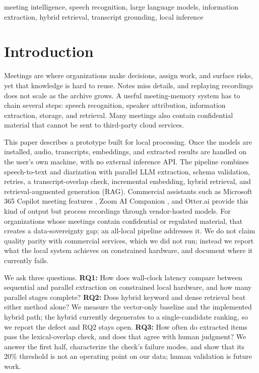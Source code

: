 \documentclass[conference]{IEEEtran}
\begin{document}
\begin{IEEEkeywords}
meeting intelligence, speech recognition, large language models, information extraction, hybrid retrieval, transcript grounding, local inference
\end{IEEEkeywords}

\section{Introduction}
Meetings are where organizations make decisions, assign work, and surface risks, yet that knowledge is hard to reuse. Notes miss details, and replaying recordings does not scale as the archive grows. A useful meeting-memory system has to chain several steps: speech recognition, speaker attribution, information extraction, storage, and retrieval. Many meetings also contain confidential material that cannot be sent to third-party cloud services.

This paper describes a prototype built for local processing. Once the models are installed, audio, transcripts, embeddings, and extracted results are handled on the user's own machine, with no external inference API. The pipeline combines speech-to-text and diarization with parallel LLM extraction, schema validation, retries, a transcript-overlap check, incremental embedding, hybrid retrieval, and retrieval-augmented generation (RAG). Commercial assistants such as Microsoft 365 Copilot meeting features \cite{m365}, Zoom AI Companion \cite{zoom}, and Otter.ai \cite{otter} provide this kind of output but process recordings through vendor-hosted models. For organizations whose meetings contain confidential or regulated material, that creates a data-sovereignty gap; an all-local pipeline addresses it. We do not claim quality parity with commercial services, which we did not run; instead we report what the local system achieves on constrained hardware, and document where it currently fails.

We ask three questions. \textbf{RQ1:} How does wall-clock latency compare between sequential and parallel extraction on constrained local hardware, and how many parallel stages complete? \textbf{RQ2:} Does hybrid keyword and dense retrieval beat either method alone? We measure the vector-only baseline and the implemented hybrid path; the hybrid currently degenerates to a single-candidate ranking, so we report the defect and RQ2 stays open. \textbf{RQ3:} How often do extracted items pass the lexical-overlap check, and does that agree with human judgment? We answer the first half, characterize the check's failure modes, and show that its 20\% threshold is not an operating point on our data; human validation is future work.
\end{document}
